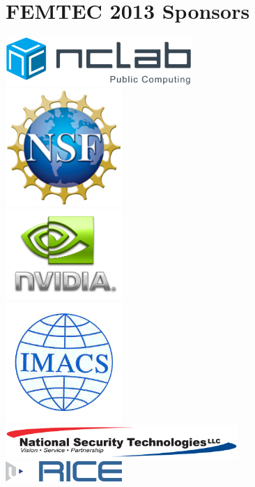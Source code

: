 \documentclass[article, A4, 11pt]{llncs}%
\begin{document}
\chapter*{\huge FEMTEC 2013 Sponsors}

\begin{center}
\vspace{2.5mm}
\includegraphics[width=200pt]{img/logo-nclab.png}\\
\vspace{5mm}
\includegraphics[width=125pt]{img/logo-nsf.png}\\
\vspace{5mm}
\includegraphics[width=125pt]{img/logo-nvidia.png}\\
\vspace{5mm}
\includegraphics[width=125pt]{img/logo-imacs.png}\\
\vspace{5mm}
\includegraphics[width=250pt]{img/logo-nstec.png}\\
\vspace{8mm}
\includegraphics[width=125pt]{img/logo-rice.png}\\
\end{center}
\end{document}

